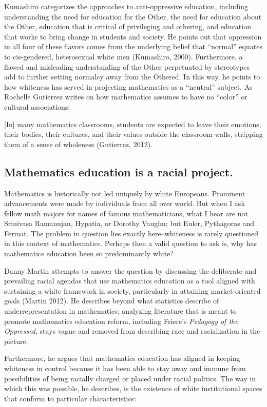 Kumashiro categorizes the approaches to anti-oppressive education, including understanding the need for education for the Other, the need for education about the Other, education that is critical of privileging and othering, and education that works to bring change in students and society. He points out that oppression in all four of these flavors comes from the underlying belief that ``normal'' equates to cis-gendered, heterosexual white men (Kumashiro, 2000). Furthermore, a flawed and misleading understanding of the Other perpetuated by stereotypes add to further setting normalcy away from the Othered. In this way, he points to how whiteness has served in projecting mathematics as a ``neutral'' subject. As Rochelle Gutierrez writes on how mathematics assumes to have no ``color'' or cultural associations:
\begin{displayquote}
  {[In]} many mathematics classrooms, students are expected to leave their emotions, their bodies, their cultures, and their values outside the classroom walls, stripping them of a sense of wholeness (Gutierrez, 2012).
\end{displayquote}

\subsection{Mathematics education is a racial project.}
Mathematics is historically not led uniquely by white Europeans. Prominent advancements were made by individuals from all over world. But when I ask fellow math majors for names of famous mathematicians, what I hear are not Srinivasa Ramanujan, Hypatia, or Dorothy Vaughn; but Euler, Pythagoras and Fermat. The problem in question lies exactly here--whiteness is rarely questioned in this context of mathematics. Perhaps then a valid question to ask is, why has mathematics education been so predominantly white?

Danny Martin attempts to answer the question by discussing the deliberate and prevailing racial agendas that use mathematics education as a tool aligned with sustaining a white framework in society, particularly in attaining market-oriented goals (Martin 2012). He describes beyond what statistics describe of underrepresentation in mathematics; analyzing literature that is meant to promote mathematics education reform, including Friere's \textit{Pedagogy of the Oppressed}, stays vague and removed from describing race and racialization in the picture.

Furthermore, he argues that mathematics education has aligned in keeping whiteness in control because it has been able to stay away and immune from possibilities of being racially charged or placed under racial politics. The way in which this was possible, he describes, is the existence of white institutional spaces that conform to particular characteristics:

